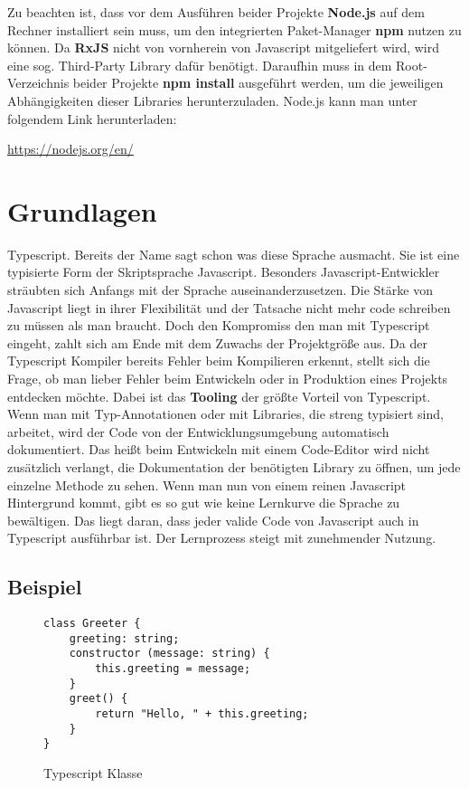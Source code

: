 \noindent
Zu beachten ist, dass vor dem Ausführen beider Projekte \textbf{Node.js} auf dem Rechner installiert sein muss, um den integrierten Paket-Manager \textbf{npm} nutzen zu können. Da \textbf{RxJS} nicht von vornherein von Javascript mitgeliefert wird, wird eine sog. \glqq Third-Party Library\grqq{} dafür benötigt. Daraufhin muss in dem Root-Verzeichnis beider Projekte \textbf{npm install} ausgeführt werden, um die jeweiligen Abhängigkeiten dieser Libraries herunterzuladen. Node.js kann man unter folgendem Link herunterladen:

\begin{center}
\url{https://nodejs.org/en/}
\end{center}

\section{Grundlagen}

Typescript. Bereits der Name sagt schon was diese Sprache ausmacht. Sie ist eine typisierte Form der Skriptsprache Javascript. Besonders Javascript-Entwickler sträubten sich Anfangs mit der Sprache auseinanderzusetzen. Die Stärke von Javascript liegt in ihrer Flexibilität und der Tatsache nicht mehr code schreiben zu müssen als man braucht. Doch den Kompromiss den man mit Typescript eingeht, zahlt sich am Ende mit dem Zuwachs der Projektgröße aus. Da der Typescript Kompiler bereits Fehler beim Kompilieren erkennt, stellt sich die Frage, ob man lieber Fehler beim Entwickeln oder in Produktion eines Projekts entdecken möchte. Dabei ist das \textbf{Tooling} der größte Vorteil von Typescript. Wenn man mit Typ-Annotationen oder mit Libraries, die streng typisiert sind, arbeitet, wird der Code von der Entwicklungsumgebung automatisch dokumentiert. Das heißt beim Entwickeln mit einem Code-Editor wird nicht zusätzlich verlangt, die Dokumentation der benötigten Library zu öffnen, um jede einzelne Methode zu sehen. Wenn man nun von einem reinen Javascript Hintergrund kommt, gibt es so gut wie keine Lernkurve die Sprache zu bewältigen. Das liegt daran, dass jeder valide Code von Javascript auch in Typescript ausführbar ist. Der Lernprozess steigt mit zunehmender Nutzung.

\subsection{Beispiel}

\begin{figure}[H]
\begin{lstlisting}
class Greeter {
    greeting: string;
    constructor (message: string) {
        this.greeting = message;
    }
    greet() {
        return "Hello, " + this.greeting;
    }
}  
\end{lstlisting}
\caption{Typescript Klasse \cite{typescript-example}}
\end{figure}

